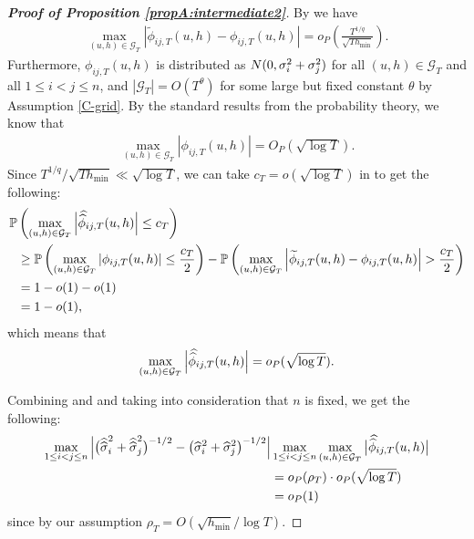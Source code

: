 \documentclass[a4paper,12pt]{article}
\makeatletter
\renewcommand{\eqref}[1]{\tagform@{\ref{#1}}}
\newcommand{\doublehat}[1]{\skew{5.5}\widehat{\widehat{#1}}}
\newcommand{\doublehattwo}[1]{\widehat{\widehat{#1}}}
\makeatother
\begin{document}
\begin{proof}[\textnormal{\textbf{Proof of Proposition \ref{propA:intermediate2}}}]
By \eqref{eq-strongapprox-bound5} we have
\begin{align*}
\max_{(u,h) \in \mathcal{G}_T}\left|\widetilde{\phi}_{ij, T}(u, h) - \phi_{ij, T}(u, h)\right| = o_P\left(\frac{T^{1/q}}{\sqrt{Th_{\min}}}\right).
\end{align*}
Furthermore, $\phi_{ij, T}(u,h)$ is distributed as $ N(0,{\sigma}^2_i + {\sigma}^2_j)$ for all $(u,h) \in \mathcal{G}_T$ and all \linebreak $1\le i < j \le n$, and $|\mathcal{G}_T| = O(T^\theta)$ for some large but fixed constant $\theta$ by \linebreak Assumption \ref{C-grid}. By the standard results from the probability theory, we know that
\begin{align*}
\max_{(u,h) \in \mathcal{G}_T}\left|\phi_{ij, T}(u, h)\right| = O_P(\sqrt{\log{T}}).
\end{align*}
Since $T^{1/q}/\sqrt{T h_{\min}} \ll \sqrt{\log T}$, we can take $c_T = o(\sqrt{\log{T}})$ in \eqref{ineq-diff-3} to get the following:
\begin{align*}
\pr&\left(\max_{(u,h) \in \mathcal{G}_T}\Big|\doublehat{\phi}_{ij, T}(u, h)\Big| \leq c_T\right)\\
&\geq \pr \left(\max_{(u,h) \in \mathcal{G}_T}\left|\phi_{ij, T}(u, h)\right| \leq \frac{c_T}{2}\right) - \pr\left(\max_{(u,h) \in \mathcal{G}_T}\left|\widetilde{\phi}_{ij, T}(u, h) - \phi_{ij, T}(u, h)\right| > \frac{c_T}{2} \right)  \\
&= 1 - o(1) - o(1) \\
&= 1 - o(1),
\end{align*}
which means that
\begin{align}\label{ineq-diff-4}
\max_{(u,h) \in \mathcal{G}_T}\Big|\doublehat{\phi}_{ij, T}(u, h)\Big| =o_P(\sqrt{\log{T}}).
\end{align}

Combining \eqref{ineq-diff-2} and \eqref{ineq-diff-4} and taking into consideration that $n$ is fixed, we get the following:
\begin{align}\label{ineq-diff-5}
\begin{split}
\max_{1 \le i < j \le n} \Big|\big(\doublehattwo{\sigma}_i^2 + \doublehattwo{\sigma}_j^2 \big)^{-1/2} - \big(\widehat{\sigma}_i^2 + \widehat{\sigma}_j^2 \big)^{-1/2}\Big|&\max_{1 \le i< j \le n} \max_{(u,h) \in \mathcal{G}_T} \big|\doublehat{\phi}_{ij,T}(u,h)\big| \\
&= o_P(\rho_T) \cdot o_P(\sqrt{\log{T}}) \\
& = o_P(1)
\end{split}
\end{align}
since by our assumption $\rho_T = O(\sqrt{h_{\min}}/\log T)$.


\end{proof}
\end{document}
